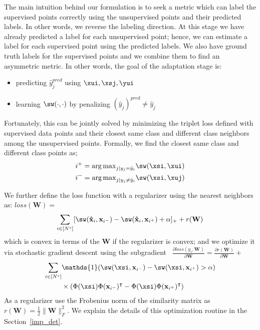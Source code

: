 The main intuition behind our formulation is to seek a metric which can label the supervised points correctly using the unsupervised points and their predicted labels. In other words, we reverse the labeling direction. At this stage we have already predicted a label for each unsupervised point; hence, we can estimate a label for each supervised point using the predicted labels. We also have ground truth labels for the supervised points and we combine them to find an asymmetric metric. In other words, the goal of the adaptation stage is:

\begin{itemize}
\item predicting $\hat{y}^{pred}_j$ using $\xui, \xsj, \yui$
\item learning $\sw(\cdot,\cdot)$ by penalizing  $(\hat{y}_j)^{pred} \neq \hat{y}_j$ 
\end{itemize}

Fortunately, this can be jointly solved by minimizing the triplet loss defined with supervised data points and their closest same class and different class neighbors among the unsupervised points. Formally, we find the closest same class and different class points as;
\begin{equation}
\begin{aligned}
&i^{+} = {\arg\max}_{j | y_j = \hat{y}_i} \sw(\xsi, \xui) \\
&i^{-} = {\arg\max}_{j | y_j \neq \hat{y}_i} \sw(\xsi,\xuj) 
\label{sup_nn}
\end{aligned}
\end{equation}

We further define the loss function with a regularizer using the nearest neighbors as: $loss(\mathbf{W})=$
\begin{equation}
 \sum_{i \in [N^s]} [\sw(\mathbf{\hat{x}}_i,\mathbf{x}_{i^-}) - \sw(\mathbf{\hat{x}}_i,\mathbf{x}_{i^+}) + \alpha]_{+} + r(\mathbf{W})
\end{equation}
which is convex in terms of the $\mathbf{W}$ if the regularizer is convex; and we optimize it via stochastic gradient descent using the subgradient \
\mbox{$\frac{\partial loss (y_i, \mathbf{W})}{\partial \mathbf{W}} = \frac{\partial r ( \mathbf{W})}{\partial \mathbf{W}} + $}
\begin{equation}
\begin{aligned}
\sum_{i \in [N^s]} &\mathds{1}(\sw(\xsi,\mathbf{x}_{i^-}) - \sw(\xsi,\mathbf{x}_{i^+})>\alpha) \\
&\times \left( \Phi(\xsi)\Phi(\mathbf{x}_{i^-})^\intercal - \Phi(\xsi)\Phi(\mathbf{x}_{i^+})^\intercal  \right)  
\end{aligned}
\label{gradw}
\end{equation}
As a regularizer use the Frobenius norm of the similarity matrix as $r(\mathbf{W})=\frac{1}{2}\|\mathbf{W}\|_F^2$. We explain the details of this optimization routine in the Section~\ref{imp_det}.
